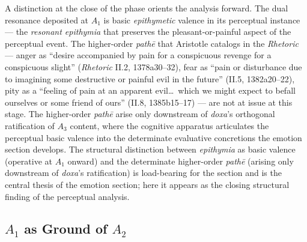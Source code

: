 \documentclass{article}
\begin{document}
A distinction at the close of the phase orients the analysis forward. The dual resonance deposited at $A_1$ is basic \textit{epithymetic} valence in its perceptual instance --- the \textit{resonant epithymia} that preserves the pleasant-or-painful aspect of the perceptual event. The higher-order \textit{pathē} that Aristotle catalogs in the \textit{Rhetoric} --- anger as ``desire accompanied by pain for a conspicuous revenge for a conspicuous slight'' (\textit{Rhetoric} II.2, 1378a30--32), fear as ``pain or disturbance due to imagining some destructive or painful evil in the future'' (II.5, 1382a20--22), pity as a ``feeling of pain at an apparent evil\ldots\ which we might expect to befall ourselves or some friend of ours'' (II.8, 1385b15--17) --- are not at issue at this stage. The higher-order \textit{pathē} arise only downstream of \textit{doxa}'s orthogonal ratification of $A_3$ content, where the cognitive apparatus articulates the perceptual basic valence into the determinate evaluative concretions the emotion section develops. The structural distinction between \textit{epithymia} as basic valence (operative at $A_1$ onward) and the determinate higher-order \textit{pathē} (arising only downstream of \textit{doxa}'s ratification) is load-bearing for the section and is the central thesis of the emotion section; here it appears as the closing structural finding of the perceptual analysis.

\subsection{$A_1$ as Ground of $A_2$}
\end{document}
